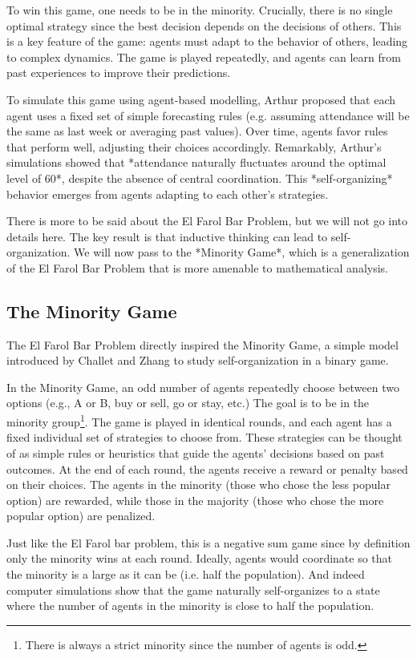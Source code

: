 \documentclass[a4paper, amsfonts, amssymb, amsmath, reprint, showkeys, nofootinbib, twoside]{revtex4-1}
\begin{document}
To win this game, one needs to be in the minority. Crucially, there is no single optimal strategy since the best decision depends on the decisions of others. This is a key feature of the game: agents must adapt to the behavior of others, leading to complex dynamics. The game is played repeatedly, and agents can learn from past experiences to improve their predictions.

To simulate this game using agent-based modelling, Arthur proposed that each agent uses a fixed set of simple forecasting rules (e.g. assuming attendance will be the same as last week or averaging past values). Over time, agents favor rules that perform well, adjusting their choices accordingly. Remarkably, Arthur's simulations showed that *attendance naturally fluctuates around the optimal level of 60*, despite the absence of central coordination. This *self-organizing* behavior emerges from agents adapting to each other’s strategies.

There is more to be said about the El Farol Bar Problem, but we will not go into details here. The key result is that inductive thinking can lead to self-organization. We will now pass to the *Minority Game*, which is a generalization of the El Farol Bar Problem that is more amenable to mathematical analysis.


\subsection{The Minority Game}

The El Farol Bar Problem directly inspired the Minority Game, a simple model introduced by Challet and Zhang \cite{Challet_1997} to study self-organization in a binary game.

In the Minority Game, an odd number of agents repeatedly choose between two options (e.g., A or B, buy or sell, go or stay, etc.) The goal is to be in the minority group\footnote{There is always a strict minority since the number of agents is odd.}. The game is played in identical rounds, and each agent has a fixed individual set of strategies to choose from. These strategies can be thought of as simple rules or heuristics that guide the agents' decisions based on past outcomes. At the end of each round, the agents receive a reward or penalty based on their choices. The agents in the minority (those who chose the less popular option) are rewarded, while those in the majority (those who chose the more popular option) are penalized.

Just like the El Farol bar problem, this is a negative sum game since by definition only the minority wins at each round. Ideally, agents would coordinate so that the minority is a large as it can be (i.e. half the population). And indeed computer simulations show that the game naturally self-organizes to a state where the number of agents in the minority is close to half the population.
\end{document}
